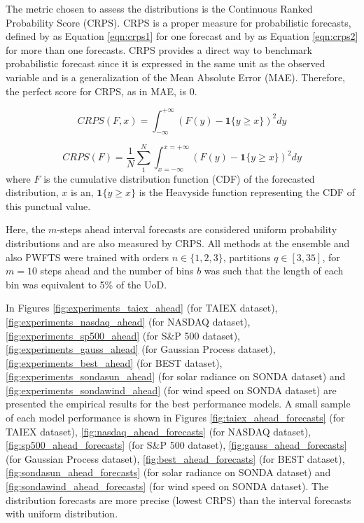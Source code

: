 The metric chosen to assess the distributions is the Continuous Ranked Probability Score (CRPS). CRPS is a proper measure for probabilistic forecasts, defined by  \cite{Gneiting2007b} as Equation \eqref{eqn:crps1} for one forecast and by \cite{Gneiting2007b} as Equation \eqref{eqn:crps2} for more than one forecasts. CRPS provides a direct way to benchmark probabilistic forecast since it is expressed in the same unit as the observed variable and is a generalization of the Mean Absolute Error (MAE). Therefore, the perfect score for CRPS, as in MAE, is 0.

\begin{equation}
CRPS(F,x) = \int_{-\infty}^{+\infty} (F(y) - \mathbf{1}\{y \geq x\})^2  dy
\label{eqn:crps1}
\end{equation}

\begin{equation}
CRPS(F) = \frac{1}{N} \sum_{1}^{N} \int_{x=-\infty}^{x=+\infty} (F(y) - \mathbf{1}\{y \geq x\})^2  dy
\label{eqn:crps2}
\end{equation}
where $F$ is the cumulative distribution function (CDF) of the forecasted distribution, $x$ is  an, $\mathbf{1}\{y \geq x\}$ is the Heavyside function representing the CDF of this punctual value.

Here, the $m$-steps ahead interval forecasts are considered uniform probability distributions and are also measured by CRPS. All methods at the ensemble and also $\mathbb{P}$WFTS were trained with orders $n \in \{1,2,3\}$, partitions $q \in [3,35]$, for $m = 10$ steps ahead and the number of bins $b$ was such that the length of each bin was equivalent to 5\% of the UoD.

In Figures \ref{fig:experiments_taiex_ahead} (for TAIEX dataset),  \ref{fig:experiments_nasdaq_ahead} (for NASDAQ dataset),  \ref{fig:experiments_sp500_ahead} (for S\&P 500 dataset),  \ref{fig:experiments_gauss_ahead} (for Gaussian Process dataset),  \ref{fig:experiments_best_ahead} (for BEST dataset),  \ref{fig:experiments_sondasun_ahead} (for solar radiance on SONDA dataset) and \ref{fig:experiments_sondawind_ahead} (for wind speed on SONDA dataset) are presented the empirical results for the best performance models. A small sample of each model performance is shown in Figures \ref{fig:taiex_ahead_forecasts} (for TAIEX dataset),  \ref{fig:nasdaq_ahead_forecasts} (for NASDAQ dataset),  \ref{fig:sp500_ahead_forecasts} (for S\&P 500 dataset),  \ref{fig:gauss_ahead_forecasts} (for Gaussian Process dataset),  \ref{fig:best_ahead_forecasts} (for BEST dataset),  \ref{fig:sondasun_ahead_forecasts} (for solar radiance on SONDA dataset) and \ref{fig:sondawind_ahead_forecasts} (for wind speed on SONDA dataset). The distribution forecasts are more precise (lowest CRPS) than the interval forecasts with uniform distribution.

